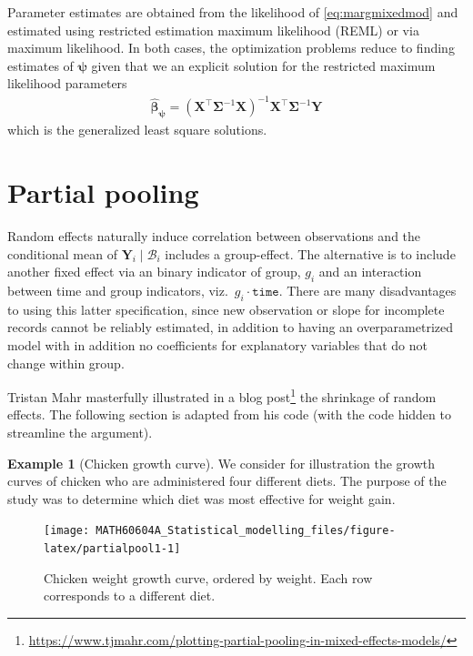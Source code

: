 \documentclass[
  11pt,
  letterpaper,
]{book}
\renewcommand{\href}[2]{#2\footnote{\url{#1}}}
\theoremstyle{definition}
\theoremstyle{definition}
\newtheorem{example}{Example}[chapter]
\theoremstyle{definition}
\theoremstyle{definition}
\theoremstyle{remark}
\begin{document}
Parameter estimates are obtained from the likelihood of \eqref{eq:margmixedmod} and estimated using restricted estimation maximum likelihood (REML) or via maximum likelihood. In both cases, the optimization problems reduce to finding estimates of \(\boldsymbol{\psi}\) given that we an explicit solution for the restricted maximum likelihood parameters
\begin{align*}
\widehat{\boldsymbol{\beta}}_{\boldsymbol{\psi}} = (\mathbf{X}^\top\boldsymbol{\Sigma}^{-1}\mathbf{X})^{-1}\mathbf{X}^\top\boldsymbol{\Sigma}^{-1}\boldsymbol{Y}
\end{align*}
which is the generalized least square solutions.

\hypertarget{partial-pooling}{%
\section{Partial pooling}\label{partial-pooling}}

Random effects naturally induce correlation between observations and the conditional mean of \(\boldsymbol{Y}_i \mid \mathcal{B}_i\) includes a group-effect. The alternative is to include another fixed effect via an binary indicator of group, \(g_i\) and an interaction between time and group indicators, viz.~\(g_i\cdot \texttt{time}\). There are many disadvantages to using this latter specification, since new observation or slope for incomplete records cannot be reliably estimated, in addition to having an overparametrized model with in addition no coefficients for explanatory variables that do not change within group.

\href{https://www.tjmahr.com/plotting-partial-pooling-in-mixed-effects-models/}{Tristan Mahr masterfully illustrated in a blog post} the shrinkage of random effects. The following section is adapted from his code (with the code hidden to streamline the argument).

\begin{example}[Chicken growth curve]
\protect\hypertarget{exm:chickcurve}{}\label{exm:chickcurve}We consider for illustration the growth curves of chicken who are administered four different diets. The purpose of the study was to determine which diet was most effective for weight gain.
\end{example}

\begin{figure}

{\centering \texttt{[image: MATH60604A\_Statistical\_modelling\_files/figure-latex/partialpool1-1]} 

}

\caption{Chicken weight growth curve, ordered by weight. Each row corresponds to a different diet.}\label{fig:partialpool1}
\end{figure}
\end{document}
